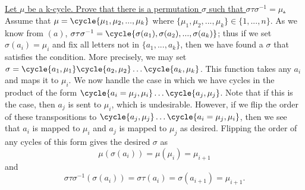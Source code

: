 \documentclass[10pt,a4paper]{report}
\begin{document}
\subsection{}
\underline{Let $\mu$ be a k-cycle. Prove that there is a permutation $\sigma$ such that $\sigma\tau\sigma^{-1}=\mu$.}\newline
\indent Assume that $\mu = \cycle{\mu_{1},\mu_{2},...,\mu_{k}}$ where $\{\mu_{1},\mu_{2},...,\mu_{k}\}\in\{1,...,n\}$. As we know from $(a)$, $\sigma\tau\sigma^{-1}=\cycle{\sigma(a_{1}),\sigma(a_{2}),...,\sigma(a_{k})}$; thus if we set $\sigma(a_{i})=\mu_{i}$ and fix all letters not in $\{a_{1},...,a_{k}\}$, then we have found a $\sigma$ that satisfies the condition. 
\newline\indent More precisely, we may set $\sigma=\cycle{a_{1},\mu_{1}}\cycle{a_{2},\mu_{2}}\dots\cycle{a_{k},\mu_{k}}$. This function takes any $a_{i}$ and maps it to $\mu_{i}$. 
We now handle the case in which we have cycles in the product of the form $\cycle{a_{i}=\mu_{j},\mu_{i}}\dots\cycle{a_{j},\mu_{j}}$. Note that if this is the case, then $a_{j}$ is sent to $\mu_{i}$, which is undesirable. However, if we flip the order of these transpositions to $\cycle{a_{j},\mu_{j}}\dots\cycle{a_{i}=\mu_{j},\mu_{i}}$, then we see that $a_{i}$ is mapped to $\mu_{i}$ and $a_{j}$ is mapped to $\mu_{j}$ as desired. Flipping the order of any cycles of this form gives the desired $\sigma$ as 
\[
\mu(\sigma(a_{i}))=\mu(\mu_{i})=\mu_{i+1}
\]
and 
\[
\sigma\tau\sigma^{-1}(\sigma(a_{i}))=\sigma\tau(a_{i})=\sigma(a_{i+1})=\mu_{i+1}.
\]
\end{document}
